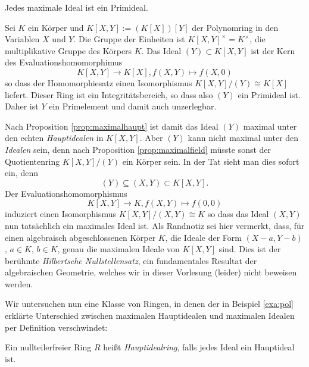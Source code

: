 \documentclass{book}
\begin{document}
\begin{cor}
    \label{cor:maxprim}
    Jedes maximale Ideal ist ein Primideal.
\end{cor}

\begin{exa}
    \label{exa:pol}
    Sei $K$ ein Körper und $K[X,Y] := (K[X])[Y]$ der Polynomring in den Variablen $X$ und
    $Y$. Die Gruppe der Einheiten ist $K[X,Y]^{\times} = K^{\times}$, die
    multiplikative Gruppe des Körpers $K$. Das Ideal $(Y) \subset K[X,Y]$ ist
    der Kern des Evaluationshomomorphimus
    \[
        K[X,Y] \to K[X], f(X,Y) \mapsto f(X,0)
    \]
    so dass der Homomorphiesatz einen Isomorphismus $K[X,Y]/(Y) \cong K[X]$
    liefert. Dieser Ring ist ein Integritätsbereich, so dass also $(Y)$ ein
    Primideal ist. Daher ist $Y$ ein Primelement und damit auch unzerlegbar. 

    Nach Proposition \ref{prop:maximalhaupt} ist damit das Ideal $(Y)$ maximal
    unter den echten \emph{Hauptidealen} in $K[X,Y]$. Aber $(Y)$ kann nicht
    maximal unter den \emph{Idealen} sein, denn nach Proposition
    \ref{prop:maximalfield} müsste sonst der Quotientenring $K[X,Y]/(Y)$ ein
    Körper sein. 
%
    In der Tat sieht man dies sofort ein, denn
    \[
        (Y) \subseteq (X,Y) \subset K[X,Y].
    \]
    Der Evaluationshomomorphismus
    \[
        K[X,Y] \to K, f(X,Y) \mapsto f(0,0)
    \]
    induziert einen Isomorphismus $K[X,Y]/(X,Y) \cong K$ so dass das Ideal
    $(X,Y)$ nun tatsächlich ein maximales Ideal ist. 
%
    Als Randnotiz sei hier vermerkt, dass, für einen algebraisch
    abgeschlossenen Körper $K$, die Ideale der Form $(X-a,Y-b)$, $a \in K$, $b
    \in K$, genau die maximalen Ideale von $K[X,Y]$ sind. Dies ist der berühmte
    \emph{Hilbertsche Nullstellensatz}, ein fundamentales Resultat der
    algebraischen Geometrie, welches wir in dieser Vorlesung (leider) nicht
    beweisen werden.
\end{exa}

Wir untersuchen nun eine Klasse von Ringen, in denen der in Beispiel
\ref{exa:pol} erklärte Unterschied zwischen maximalen Hauptidealen und
maximalen Idealen per Definition verschwindet:

\begin{defi}
    \label{defi:hauptidealring}
    Ein nullteilerfreier Ring $R$ heißt \emph{Hauptidealring}, falls jedes Ideal ein Hauptideal ist. 
\end{defi}
    
\end{document}
